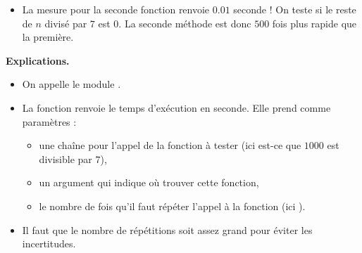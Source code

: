 \documentclass[11pt,class=report,crop=false]{standalone}
\begin{document}
\begin{cours}
\begin{itemize}
  \item La mesure pour la seconde fonction renvoie $0.01$ seconde ! On teste si le reste de $n$ divisé par $7$ est $0$. La seconde méthode est donc $500$ fois plus rapide que la première.
\end{itemize}  

\textbf{Explications.}
\begin{itemize}
  \item On appelle le module .
    
  \item La fonction  renvoie le temps d'exécution en seconde.
Elle prend comme paramètres : 
  \begin{itemize}
    \item une chaîne pour l'appel de la fonction à tester (ici est-ce que $1000$ est divisible par $7$),
    \item un argument  qui indique où trouver cette fonction,
    \item le nombre de fois qu'il faut répéter l'appel à la fonction (ici ).
  \end{itemize}
  \item Il faut que le nombre de répétitions soit assez grand pour éviter les incertitudes.
\end{itemize} 

\end{cours}


\end{document}
